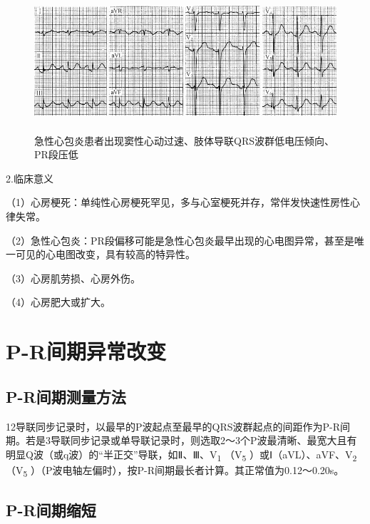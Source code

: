 \begin{figure}[!htbp]
 \centering
 \includegraphics[width=5.58333in,height=2.04167in]{./images/Image00036.jpg}
 \captionsetup{justification=centering}
 \caption{急性心包炎患者出现窦性心动过速、肢体导联QRS波群低电压倾向、PR段压低}
 \label{fig2-1}
  \end{figure} 

2.临床意义

（1）心房梗死：单纯性心房梗死罕见，多与心室梗死并存，常伴发快速性房性心律失常。

（2）急性心包炎：PR段偏移可能是急性心包炎最早出现的心电图异常，甚至是唯一可见的心电图改变，具有较高的特异性。

（3）心房肌劳损、心房外伤。

（4）心房肥大或扩大。

\protect\hypertarget{text00008.htmlux5cux23subid29}{}{}

\section{P-R间期异常改变}

\protect\hypertarget{text00008.htmlux5cux23subid30}{}{}

\subsection{P-R间期测量方法}

12导联同步记录时，以最早的P波起点至最早的QRS波群起点的间距作为P-R间期。若是3导联同步记录或单导联记录时，则选取2～3个P波最清晰、最宽大且有明显Q波（或q波）的“半正交”导联，如Ⅱ、Ⅲ、V\textsubscript{1}
（V\textsubscript{5} ）或Ⅰ（aVL）、aVF、V\textsubscript{2}
（V\textsubscript{5}
）（P波电轴左偏时），按P-R间期最长者计算。其正常值为0.12～0.20s。

\protect\hypertarget{text00008.htmlux5cux23subid31}{}{}

\subsection{P-R间期缩短}

